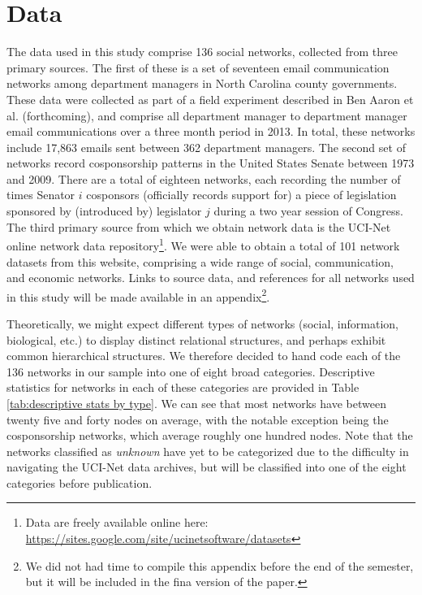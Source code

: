 \documentclass[3p,times]{elsarticle}
\begin{document}
\section{Data}
\label{sec:data}
The data used in this study comprise 136 social networks, collected from three primary sources. The first of these is a set of seventeen email communication networks among department managers in North Carolina county governments. These data were collected as part of a field experiment described in Ben Aaron et al. (forthcoming), and comprise all department manager to department manager email communications over a three month period in 2013. In total, these networks include 17,863 emails sent between 362 department managers. The second set of networks record cosponsorship patterns in the United States Senate between 1973 and 2009. There are a total of eighteen networks, each recording the number of times Senator $i$ cosponsors (officially records support for) a piece of legislation sponsored by (introduced by) legislator $j$ during a two year session of Congress. The third primary source from which we obtain network data is the UCI-Net online network data repository\footnote{Data are freely available online here: \href{https://sites.google.com/site/ucinetsoftware/datasets}{https://sites.google.com/site/ucinetsoftware/datasets}}. We were able to obtain a total of 101 network datasets from this website, comprising a wide range of social, communication, and economic networks. Links to source data, and references for all networks used in this study will be made available in an appendix\footnote{We did not had time to compile this appendix before the end of the semester, but it will be included in the fina version of the paper.}.

Theoretically, we might expect different types of networks (social, information, biological, etc.) to display distinct relational structures, and perhaps exhibit common hierarchical structures. We therefore decided to hand code each of the 136 networks in our sample into one of eight broad categories. Descriptive statistics for networks in each of these categories are provided in Table \ref{tab:descriptive stats by type}. We can see that most networks have between twenty five and forty nodes on average, with the notable exception being the cosponsorship networks, which average roughly one hundred nodes. Note that the networks classified as \emph{unknown} have yet to be categorized due to the difficulty in navigating the UCI-Net data archives, but will be classified into one of the eight categories before publication. 
\end{document}
